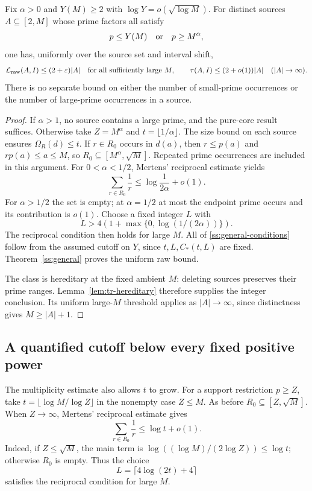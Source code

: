 \begin{corollary}
\label{ss:fixed-alpha}
Fix $\alpha>0$ and $Y(M)\ge2$ with $\log Y=o(\sqrt{\log M})$.
For distinct sources $A\subseteq[2,M]$ whose prime factors all satisfy
\[
 p\le Y(M)\quad\hbox{or}\quad p\ge M^\alpha,
\]
one has, uniformly over the source set and interval shift,
\[
 \mathcal L_{\rm raw}(A,I)\le(2+\varepsilon)|A|
 \quad\hbox{for all sufficiently large }M,
 \qquad
 \tau(A,I)\le(2+o(1))|A|\quad(|A|\to\infty).
\]
There is no separate bound on either the number of small-prime
occurrences or the number of large-prime occurrences in a source.
\end{corollary}

\begin{proof}
If $\alpha>1$, no source contains a large prime, and the pure-core
result suffices. Otherwise take $Z=M^\alpha$ and
$t=\lfloor1/\alpha\rfloor$. The size bound on each source ensures
$\Omega_R(d)\le t$.
If $r\in R_0$ occurs in $d(a)$, then $r\le p(a)$ and
$rp(a)\le a\le M$, so
$R_0\subseteq[M^\alpha,\sqrt M]$. Repeated prime occurrences are included
in this argument. For $0<\alpha<1/2$, Mertens' reciprocal estimate yields
\[
 \sum_{r\in R_0}\frac1r
 \le\log\frac1{2\alpha}+o(1).
 \]
For $\alpha>1/2$ the set is empty; at $\alpha=1/2$ at most the endpoint
prime occurs and its contribution is $o(1)$.
Choose a fixed integer $L$ with
\[
 L>4\left(1+\max\{0,\log(1/(2\alpha))\}\right).
 \]
The reciprocal condition then holds for large $M$.
All of \eqref{ss:general-conditions} follow from the assumed cutoff
on $Y$, since $t,L,C_*(t,L)$ are fixed. Theorem~\ref{ss:general}
proves the uniform raw bound.

The class is hereditary at the fixed ambient $M$: deleting sources
preserves their prime ranges. Lemma~\ref{lem:tr-hereditary}
therefore supplies the integer conclusion.
Its uniform large-$M$ threshold applies as $|A|\to\infty$, since
distinctness gives $M\ge|A|+1$.
\end{proof}

\subsection{A quantified cutoff below every fixed positive power}

The multiplicity estimate also allows $t$ to grow.
For a support restriction $p\ge Z$, take
$t=\lfloor\log M/\log Z\rfloor$ in the nonempty case $Z\le M$.
As before $R_0\subseteq[Z,\sqrt M]$.
When $Z\to\infty$, Mertens' reciprocal estimate gives
\[
 \sum_{r\in R_0}\frac1r\le\log t+o(1).
 \]
Indeed, if $Z\le\sqrt M$, the main term is
$\log((\log M)/(2\log Z))\le\log t$; otherwise $R_0$ is empty.
Thus the choice
\begin{equation}
 L=\lceil4\log(2t)+4\rceil
 \label{ss:growing-discount}
\end{equation}
satisfies the reciprocal condition for large $M$.

